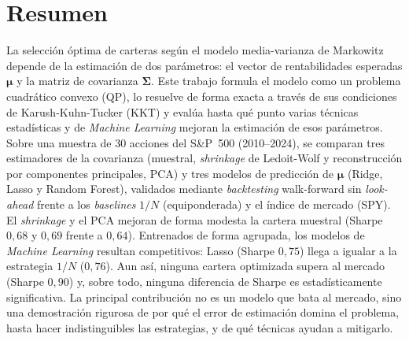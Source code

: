 \thispagestyle{plain}
\chapter*{Resumen}

La selección óptima de carteras según el modelo media-varianza de Markowitz
depende de la estimación de dos parámetros: el vector de rentabilidades
esperadas $\boldsymbol{\mu}$ y la matriz de covarianza $\boldsymbol{\Sigma}$.
Este trabajo formula el modelo como un problema cuadrático convexo (QP), lo
resuelve de forma exacta a través de sus condiciones de Karush-Kuhn-Tucker (KKT)
y evalúa hasta qué punto varias técnicas estadísticas y de \textit{Machine
Learning} mejoran la estimación de esos parámetros. Sobre una muestra de 30
acciones del S\&P~500 (2010--2024), se comparan tres estimadores de la covarianza
(muestral, \textit{shrinkage} de Ledoit-Wolf y reconstrucción por componentes
principales, PCA) y tres modelos de predicción de $\boldsymbol{\mu}$ (Ridge,
Lasso y Random Forest), validados mediante \textit{backtesting} walk-forward sin
\textit{look-ahead} frente a los \textit{baselines} $1/N$ (equiponderada) y el
índice de mercado (SPY). El \textit{shrinkage} y el PCA mejoran de forma modesta
la cartera muestral (Sharpe $0{,}68$ y $0{,}69$ frente a $0{,}64$). Entrenados de
forma agrupada, los modelos de \textit{Machine Learning} resultan competitivos:
Lasso (Sharpe $0{,}75$) llega a igualar a la estrategia $1/N$ ($0{,}76$). Aun
así, ninguna cartera optimizada supera al mercado (Sharpe $0{,}90$) y, sobre
todo, ninguna diferencia de Sharpe es estadísticamente significativa. La
principal contribución no es un modelo que bata al mercado, sino una
demostración rigurosa de por qué el error de estimación domina el problema,
hasta hacer indistinguibles las estrategias, y de qué técnicas ayudan a
mitigarlo.


\MediaOptionLogicBlank

